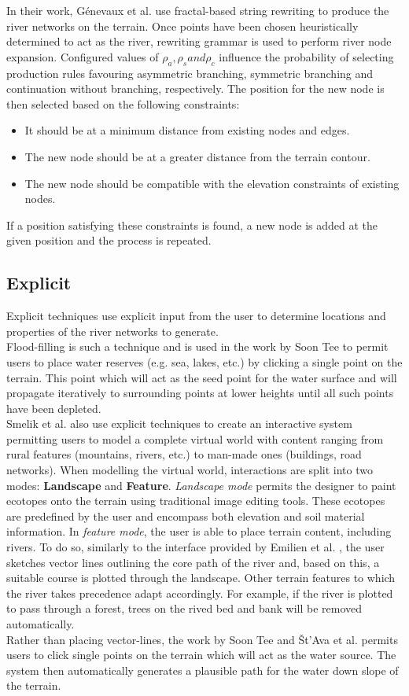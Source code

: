 In their work, Génevaux et al. \cite{Genevaux2013} use fractal-based string rewriting to produce the river networks on the terrain. Once points have been chosen heuristically determined to act as the river, rewriting grammar is used to perform river node expansion. Configured values of $\rho_{a}, \rho_{s} and \rho_{c}$ influence the probability of selecting production rules favouring asymmetric branching, symmetric branching and continuation without branching, respectively. The position for the new node is then selected based on the following constraints:
\begin{itemize}
\item It should be at a minimum distance from existing nodes and edges.
\item The new node should be at a greater distance from the terrain contour.
\item The new node should be compatible with the elevation constraints of existing nodes.
\end{itemize}
If a position satisfying these constraints is found, a new node is added at the given position and the process is repeated.\\


\subsection{Explicit}

Explicit techniques use explicit input from the user to determine locations and properties of the river networks to generate.\\

Flood-filling is such a technique and is used in the work by Soon Tee \cite{Teoh2008} to permit users to place water reserves (e.g. sea, lakes, etc.) by clicking a single point on the terrain. This point which will act as the seed point for the water surface and will propagate iteratively to surrounding points at lower heights until all such points have been depleted. \\

Smelik et al. also use explicit techniques to create an interactive system permitting users to model a complete virtual world with content ranging from rural features (mountains, rivers, etc.) to man-made ones (buildings, road networks). When modelling the virtual world, interactions are split into two modes: \textbf{Landscape} and \textbf{Feature}. \textit{Landscape mode} permits the designer to paint ecotopes onto the terrain using traditional image editing tools. These ecotopes are predefined by the user and encompass both elevation and soil material information. In \textit{feature mode}, the user is able to place terrain content, including rivers. To do so, similarly to the interface provided by Emilien et al. \cite{Emilien2014}, the user sketches vector lines outlining the core path of the river and, based on this, a suitable course is plotted through the landscape. Other terrain features to which the river takes precedence adapt accordingly. For example, if the river is plotted to pass through a forest, trees on the rived bed and bank will be removed automatically. \\

Rather than placing vector-lines, the work by Soon Tee \cite{Teoh2008} and Št'Ava et al. \cite{StAva2008} permits users to click single points on the terrain which will act as the water source. The system then automatically generates a plausible path for the water down slope of the terrain.
